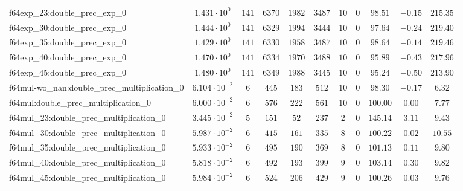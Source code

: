 \begin{tabular}{|l|c|c|c|c|c|c|c|c|c|c|}
f64exp\_23:double\_prec\_exp\_0                & $ 1.431 \cdot 10^{0}  $ & $ 141    $ & $ 6370   $ & $ 1982  $ & $ 3487  $ & $ 10  $ & $ 0 $ & $ 98.51       $ & $ -0.15   $ & $ 215.35  $ \\
f64exp\_30:double\_prec\_exp\_0                & $ 1.444 \cdot 10^{0}  $ & $ 141    $ & $ 6329   $ & $ 1994  $ & $ 3444  $ & $ 10  $ & $ 0 $ & $ 97.64       $ & $ -0.24   $ & $ 219.40  $ \\
f64exp\_35:double\_prec\_exp\_0                & $ 1.429 \cdot 10^{0}  $ & $ 141    $ & $ 6330   $ & $ 1958  $ & $ 3487  $ & $ 10  $ & $ 0 $ & $ 98.64       $ & $ -0.14   $ & $ 219.46  $ \\
f64exp\_40:double\_prec\_exp\_0                & $ 1.470 \cdot 10^{0}  $ & $ 141    $ & $ 6334   $ & $ 1970  $ & $ 3488  $ & $ 10  $ & $ 0 $ & $ 95.89       $ & $ -0.43   $ & $ 217.96  $ \\
f64exp\_45:double\_prec\_exp\_0                & $ 1.480 \cdot 10^{0}  $ & $ 141    $ & $ 6349   $ & $ 1988  $ & $ 3445  $ & $ 10  $ & $ 0 $ & $ 95.24       $ & $ -0.50   $ & $ 213.90  $ \\
f64mul-wo\_nan:double\_prec\_multiplication\_0 & $ 6.104 \cdot 10^{-2} $ & $ 6      $ & $ 445    $ & $ 183   $ & $ 512   $ & $ 10  $ & $ 0 $ & $ 98.30       $ & $ -0.17   $ & $ 6.32    $ \\
f64mul:double\_prec\_multiplication\_0         & $ 6.000 \cdot 10^{-2} $ & $ 6      $ & $ 576    $ & $ 222   $ & $ 561   $ & $ 10  $ & $ 0 $ & $ 100.00      $ & $ 0.00    $ & $ 7.77    $ \\
f64mul\_23:double\_prec\_multiplication\_0     & $ 3.445 \cdot 10^{-2} $ & $ 5      $ & $ 151    $ & $ 52    $ & $ 237   $ & $ 2   $ & $ 0 $ & $ 145.14      $ & $ 3.11    $ & $ 9.43    $ \\
f64mul\_30:double\_prec\_multiplication\_0     & $ 5.987 \cdot 10^{-2} $ & $ 6      $ & $ 415    $ & $ 161   $ & $ 335   $ & $ 8   $ & $ 0 $ & $ 100.22      $ & $ 0.02    $ & $ 10.55   $ \\
f64mul\_35:double\_prec\_multiplication\_0     & $ 5.933 \cdot 10^{-2} $ & $ 6      $ & $ 495    $ & $ 190   $ & $ 369   $ & $ 8   $ & $ 0 $ & $ 101.13      $ & $ 0.11    $ & $ 9.80    $ \\
f64mul\_40:double\_prec\_multiplication\_0     & $ 5.818 \cdot 10^{-2} $ & $ 6      $ & $ 492    $ & $ 193   $ & $ 399   $ & $ 9   $ & $ 0 $ & $ 103.14      $ & $ 0.30    $ & $ 9.82    $ \\
f64mul\_45:double\_prec\_multiplication\_0     & $ 5.984 \cdot 10^{-2} $ & $ 6      $ & $ 524    $ & $ 206   $ & $ 429   $ & $ 9   $ & $ 0 $ & $ 100.26      $ & $ 0.03    $ & $ 9.76    $ \\

\end{tabular}
